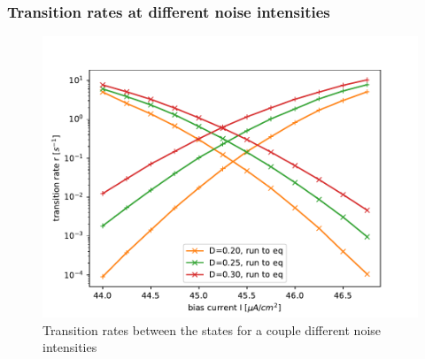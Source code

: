 \documentclass[12pt,a4paper]{article}
\begin{document}
\subsubsection{Transition rates at different noise intensities}
\begin{figure}[H]
	\centering
	\includegraphics[scale=1]{tranratesanhopf.pdf}\caption{Transition rates between the states for a couple different noise intensities}
	\label{tranrateanhopf}
\end{figure}
\end{document}
